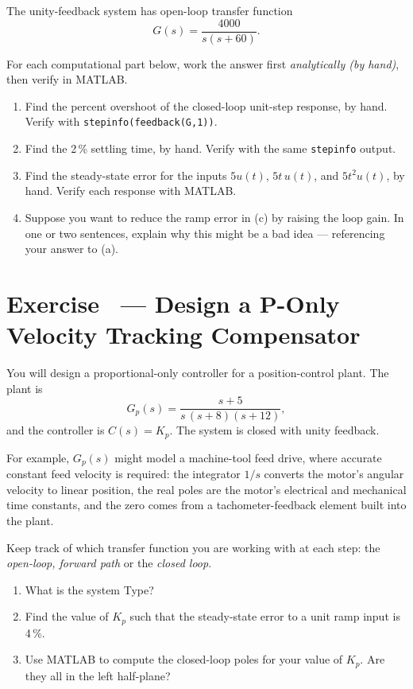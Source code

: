 \documentclass[11pt]{article}
\newcounter{exercise}
\newcommand{\exercise}[1]{%
  \refstepcounter{exercise}%
  \section*{Exercise \theexercise\ --- #1}%
}
\begin{document}
The unity-feedback system has open-loop transfer function
\[
  G(s) = \frac{4000}{s(s+60)}.
\]

For each computational part below, work the answer first \emph{analytically
(by hand)}, then verify in MATLAB.

\begin{enumerate}[label=(\alph*)]
  \item Find the percent overshoot of the closed-loop unit-step response,
    by hand.  Verify with \texttt{stepinfo(feedback(G,1))}.
  \item Find the 2\,\% settling time, by hand.  Verify with the same
    \texttt{stepinfo} output.
  \item Find the steady-state error for the inputs $5u(t)$, $5t\,u(t)$, and
    $5t^2 u(t)$, by hand.  Verify each response with MATLAB.
  \item Suppose you want to reduce the ramp error in (c) by raising the
    loop gain.  In one or two sentences, explain why this might be a bad
    idea --- referencing your answer to (a).
\end{enumerate}
\fi

\exercise{Design a P-Only Velocity Tracking Compensator}

You will design a proportional-only controller for a position-control
plant.  The plant is
\[
  G_p(s) = \frac{s+5}{s\,(s+8)(s+12)},
\]
and the controller is $C(s) = K_p$.  The system is closed with unity
feedback.

For example, $G_p(s)$ might model a machine-tool feed drive, where
accurate constant feed velocity is required: the integrator $1/s$ converts the motor's angular velocity
to linear position, the real poles are the motor's electrical
and mechanical time constants, and the zero comes from a tachometer-feedback
element built into the plant.

Keep track of which transfer function you are working
with at each step: the \emph{open-loop, forward path} or the \emph{closed loop}.

\begin{enumerate}[label=(\alph*)]
  \item What is the system Type?
  \item Find the value of $K_p$ such that the steady-state error to a unit
    ramp input is 4\,\%.
  \item Use MATLAB to compute the closed-loop poles for your value of
    $K_p$.  Are they all in the left half-plane?
\end{enumerate}
\end{document}

